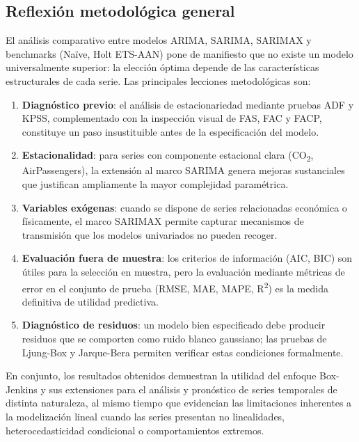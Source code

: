 \documentclass[12pt, a4paper]{article}
\begin{document}
\subsection*{Reflexión metodológica general}

El análisis comparativo entre modelos ARIMA, SARIMA, SARIMAX y benchmarks (Naïve, Holt ETS-AAN) pone de manifiesto que no existe un modelo universalmente superior: la elección óptima depende de las características estructurales de cada serie. Las principales lecciones metodológicas son:

\begin{enumerate}
    \item \textbf{Diagnóstico previo}: el análisis de estacionariedad mediante pruebas ADF y KPSS, complementado con la inspección visual de FAS, FAC y FACP, constituye un paso insustituible antes de la especificación del modelo.
    \item \textbf{Estacionalidad}: para series con componente estacional clara (CO\textsubscript{2}, AirPassengers), la extensión al marco SARIMA genera mejoras sustanciales que justifican ampliamente la mayor complejidad paramétrica.
    \item \textbf{Variables exógenas}: cuando se dispone de series relacionadas económica o físicamente, el marco SARIMAX permite capturar mecanismos de transmisión que los modelos univariados no pueden recoger.
    \item \textbf{Evaluación fuera de muestra}: los criterios de información (AIC, BIC) son útiles para la selección en muestra, pero la evaluación mediante métricas de error en el conjunto de prueba (RMSE, MAE, MAPE, R\textsuperscript{2}) es la medida definitiva de utilidad predictiva.
    \item \textbf{Diagnóstico de residuos}: un modelo bien especificado debe producir residuos que se comporten como ruido blanco gaussiano; las pruebas de Ljung-Box y Jarque-Bera permiten verificar estas condiciones formalmente.
\end{enumerate}

En conjunto, los resultados obtenidos demuestran la utilidad del enfoque Box-Jenkins y sus extensiones para el análisis y pronóstico de series temporales de distinta naturaleza, al mismo tiempo que evidencian las limitaciones inherentes a la modelización lineal cuando las series presentan no linealidades, heterocedasticidad condicional o comportamientos extremos.

\newpage


\end{document}
